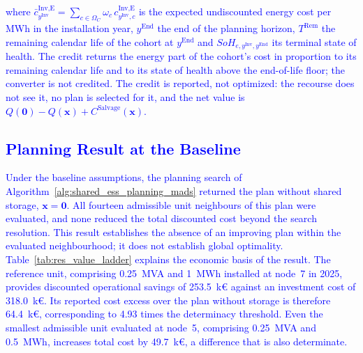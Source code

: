 \documentclass[preprint,12pt]{elsarticle}
\begin{document}
\noindent
\textcolor{blue}{
    where $\bar{c}^{\text{Inv,E}}_{y^\text{Inv}} = \sum_{c \in \Omega_C} \omega_c\, c^{\text{Inv,E}}_{y^\text{Inv},c}$ is the expected undiscounted energy cost per MWh in the installation year, $y^\text{End}$ the end of the planning horizon, $T^\text{Rem}$ the remaining calendar life of the cohort at $y^\text{End}$ and $SoH_{e,y^\text{Inv},y^\text{End}}$ its terminal state of health. The credit returns the energy part of the cohort's cost in proportion to its remaining calendar life and to its state of health above the end-of-life floor; the converter is not credited. 
    The credit is reported, not optimized: the recourse does not see it, no plan is selected for it, and the net value is $Q(\boldsymbol{0}) - Q(\boldsymbol{x}) + C^\text{Salvage}(\boldsymbol{x})$.
}

\subsection{\textcolor{blue}{Planning Result at the Baseline}}
\label{subsec:res_baseline}

\textcolor{blue}{
    Under the baseline assumptions, the planning search of Algorithm~\ref{alg:shared_ess_planning_mads} returned the plan without shared storage, $\boldsymbol{x}=\boldsymbol{0}$. All fourteen admissible unit neighbours of this plan were evaluated, and none reduced the total discounted cost beyond the search resolution. 
    This result establishes the absence of an improving plan within the evaluated neighbourhood; it does not establish global optimality. Table~\ref{tab:res_value_ladder} explains the economic basis of the result. The reference unit, comprising 0.25~MVA and 1~MWh installed at node~7 in 2025, provides discounted operational savings of 253.5~k\euro{} against an investment cost of 318.0~k\euro{}. Its reported cost excess over the plan without storage is therefore 64.4~k\euro{}, corresponding to 4.93 times the determinacy threshold. Even the smallest admissible unit evaluated at node~5, comprising 0.25~MVA and 0.5~MWh, increases total cost by 49.7~k\euro{}, a difference that is also determinate.
}
\end{document}
